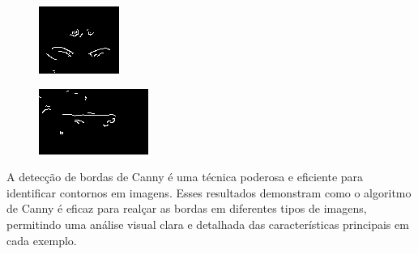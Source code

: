 \begin{figure}[h!]
    \vspace{1cm}

    \begin{minipage}[b]{0.45\textwidth}
        \centering
        \includegraphics[width=0.9\linewidth]{fig/03_nose_edge.png}
        \label{fig:canny-nariz}
    \end{minipage}
    \hfill
    \begin{minipage}[b]{0.45\textwidth}
        \centering
        \includegraphics[width=0.9\linewidth]{fig/03_mouth_edge.png}
        \label{fig:canny-boca}
    \end{minipage}
    \label{fig:canny-aplicacao}
\end{figure}
A detecção de bordas de Canny é uma técnica poderosa e eficiente para identificar contornos em imagens. Esses resultados demonstram como o algoritmo de Canny é eficaz para realçar as bordas em diferentes tipos de imagens, permitindo uma análise visual clara e detalhada das características principais em cada exemplo.

